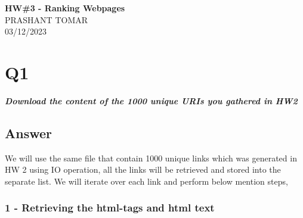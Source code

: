 \documentclass[12pt]{article}
\begin{document}
\begin{centering}
{\large\textbf{HW\#3 - Ranking Webpages}}\\ %
PRASHANT TOMAR\\                     %
03/12/2023\\                      %
\end{centering}


\section*{Q1}

\emph{ \textbf{Download the content of the 1000 unique URIs you gathered in HW2}}

\subsection*{Answer}
We will use the same file that contain 1000 unique links which was generated in HW 2 using IO operation, all the links will be retrieved and stored into the separate list. We will iterate over each link and perform below mention steps, 

\subsubsection*{1 - Retrieving the html-tags and html text  }
\end{document}
